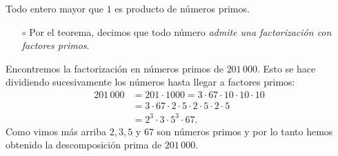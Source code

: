 \documentclass[handout]{beamer} %
\begin{document}
    
    \begin{frame}
        \begin{teorema}
            Todo  entero  mayor que $1$ es producto de números primos. 
        \end{teorema}  
        \pause
        



    \end{frame}
    
    
    \begin{frame}

        \begin{observacion}
			\begin{itemize}
				\item[$\circ$] Por el teorema,  decimos que todo número  \textit{admite una factorización con factores primos}.
			\end{itemize}
			
		\end{observacion}
        \pause
        \begin{ejemplo} 
            Encontremos la factorización en números primos de $201\,000$. Esto se hace di\-vi\-dien\-do  sucesivamente los números hasta llegar a factores primos:\pause
            \begin{align*}
                201\,000 &= 201\cdot 1000 = 3\cdot 67\cdot 10\cdot 10\cdot 10\\ &=  3\cdot 67\cdot 2\cdot 5 \cdot 2\cdot 5 \cdot 2\cdot 5 \\&= 2^3\cdot 3\cdot 5^3\cdot 67.
            \end{align*}
            Como vimos más arriba $2, 3, 5$ y $67$ son  números primos y por lo tanto hemos obtenido la descomposición prima de $201\,000$.
        \end{ejemplo}
    \end{frame}
    
\end{document}
